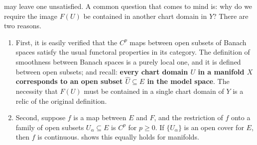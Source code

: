 \documentclass[../main-v2-manifolds.tex]{subfiles}
\begin{document}
 may leave one unsatisfied. A common question that comes to mind is: why do we require the image $F(U)$ be contained in another chart domain in $Y$? There are two reasons.
\begin{enumerate}
    \item First, it is easily verified that the $C^p$ maps between open subsets of Banach spaces satisfy the usual functoral properties in its category. The definition of smoothness between Banach spaces is a purely local one, and it is defined between open subsets; and recall: \textbf{every chart domain $U$ in a manifold $X$ corresponds to an open subset $\hat{U}\subseteq E$ in the model space}. The necessity that $F(U)$ must be contained in a single chart domain of $Y$ is a relic of the original definition.
    \item Second, suppose $f$ is a map between $E$ and $F$, and the restriction of $f$ onto a family of open subsets $U_{\alpha}\subseteq E$ is $C^p$ for $p\geq 0$. If $\{U_\alpha\}$ is an open cover for $E$, then $f$ is continuous.  shows this equally holds for manifolds.
\end{enumerate}

%
\end{document}
